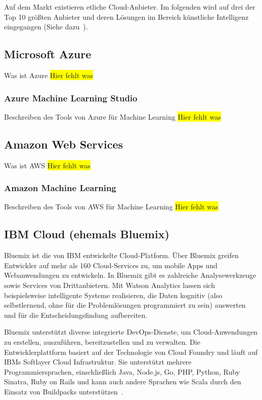 Auf dem Markt existieren etliche Cloud-Anbieter. Im folgenden wird auf drei der Top 10 größten Anbieter und deren Lösungen
im Bereich künstliche Intelligenz eingegangen (Siehe dazu~\cite{online_grundlagen_cloud}).

\subsection{Microsoft Azure}
Was ist Azure
\colorbox{yellow}{Hier fehlt was}

\subsubsection{Azure Machine Learning Studio}
Beschreiben des Tools von Azure für Machine Learning
\colorbox{yellow}{Hier fehlt was}

\subsection{Amazon Web Services}
Was ist AWS
\colorbox{yellow}{Hier fehlt was}

\subsubsection{Amazon Machine Learning}
Beschreiben des Tools von AWS für Machine Learning
\colorbox{yellow}{Hier fehlt was}

\subsection{IBM Cloud (ehemals Bluemix)}
Bluemix ist die von IBM entwickelte Cloud-Platform. Über Bluemix greifen Entwickler auf mehr als 160 Cloud-Services zu,
um mobile Apps und Webanwendungen zu entwickeln. In Bluemix gibt es zahlreiche Analysewerkzeuge sowie Services von
Drittanbietern. Mit Watson Analytics lassen sich beispielsweise intelligente Systeme realisieren, die Daten kognitiv
(also selbstlernend, ohne für die Problemlösungen programmiert zu sein) auswerten und für die Entscheidungsfindung
aufbereiten.

Bluemix unterstützt diverse integrierte DevOps-Dienste, um Cloud-Anwendungen zu erstellen, auszuführen, bereitzustellen
und zu verwalten. Die Entwicklerplattform basiert auf der Technologie von Cloud Foundry und läuft auf IBMs
Softlayer Cloud Infrastruktur. Sie unterstützt mehrere Programmiersprachen, einschließlich Java, Node.js, Go, PHP,
Python, Ruby Sinatra, Ruby on Rails und kann auch andere Sprachen wie Scala durch den Einsatz von Buildpacks
unterstützen~\cite{online_grundlagen_bluemix}.


